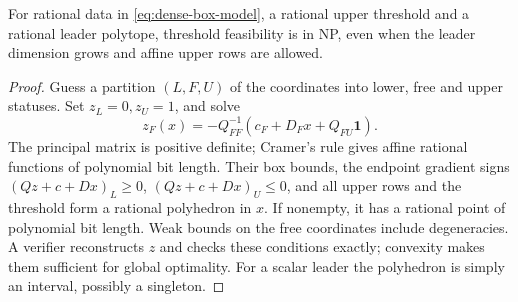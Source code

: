 \begin{lemma}\label{lem:box-np}
For rational data in \eqref{eq:dense-box-model}, a rational upper threshold and a
rational leader polytope, threshold feasibility is in NP, even when the leader
dimension grows and affine upper rows are allowed.
\end{lemma}
\begin{proof}
Guess a partition \((L,F,U)\) of the coordinates into lower, free and upper
statuses. Set \(z_L=0,z_U=1\), and solve
\[
 z_F(x)=-Q_{FF}^{-1}(c_F+D_Fx+Q_{FU}\mathbf1).
\]
The principal matrix is positive definite; Cramer's rule gives affine rational
functions of polynomial bit length. Their box bounds, the endpoint gradient
signs \((Qz+c+Dx)_L\ge0\), \((Qz+c+Dx)_U\le0\), and all upper rows and the
threshold form a rational polyhedron in \(x\). If nonempty, it has a rational
point of polynomial bit length. Weak bounds on the free coordinates include
degeneracies. A verifier reconstructs \(z\) and checks these conditions exactly;
convexity makes them sufficient for global optimality. For a scalar leader the
polyhedron is simply an interval, possibly a singleton.
\end{proof}

